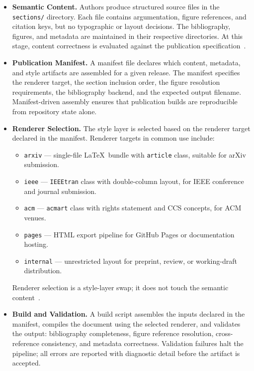 \begin{itemize}
  \item \textbf{Semantic Content.} Authors produce structured source files in the \texttt{sections/} directory. Each file contains argumentation, figure references, and citation keys, but no typographic or layout decisions. The bibliography, figures, and metadata are maintained in their respective directories. At this stage, content correctness is evaluated against the publication specification~\cite{Parnas1972Modularization}.

  \item \textbf{Publication Manifest.} A manifest file declares which content, metadata, and style artifacts are assembled for a given release. The manifest specifies the renderer target, the section inclusion order, the figure resolution requirements, the bibliography backend, and the expected output filename. Manifest-driven assembly ensures that publication builds are reproducible from repository state alone.

  \item \textbf{Renderer Selection.} The style layer is selected based on the renderer target declared in the manifest. Renderer targets in common use include:
  \begin{itemize}
    \item \texttt{arxiv} --- single-file \LaTeX\ bundle with \texttt{article} class, suitable for arXiv submission.
    \item \texttt{ieee} --- \texttt{IEEEtran} class with double-column layout, for IEEE conference and journal submission.
    \item \texttt{acm} --- \texttt{acmart} class with rights statement and CCS concepts, for ACM venues.
    \item \texttt{pages} --- HTML export pipeline for GitHub Pages or documentation hosting.
    \item \texttt{internal} --- unrestricted layout for preprint, review, or working-draft distribution.
  \end{itemize}
  Renderer selection is a style-layer swap; it does not touch the semantic content~\cite{Vogels2009EventuallyConsistent}.

  \item \textbf{Build and Validation.} A build script assembles the inputs declared in the manifest, compiles the document using the selected renderer, and validates the output: bibliography completeness, figure reference resolution, cross-reference consistency, and metadata correctness. Validation failures halt the pipeline; all errors are reported with diagnostic detail before the artifact is accepted.


\end{itemize}
